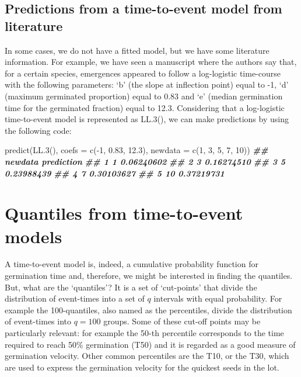 \documentclass[
]{book}
\newenvironment{Shaded}{\begin{snugshade}}{\end{snugshade}}
\newcommand{\AttributeTok}[1]{\textcolor[rgb]{0.77,0.63,0.00}{#1}}
\newcommand{\DecValTok}[1]{\textcolor[rgb]{0.00,0.00,0.81}{#1}}
\newcommand{\DocumentationTok}[1]{\textcolor[rgb]{0.56,0.35,0.01}{\textbf{\textit{#1}}}}
\newcommand{\FloatTok}[1]{\textcolor[rgb]{0.00,0.00,0.81}{#1}}
\newcommand{\FunctionTok}[1]{\textcolor[rgb]{0.00,0.00,0.00}{#1}}
\newcommand{\NormalTok}[1]{#1}
\newcommand{\SpecialCharTok}[1]{\textcolor[rgb]{0.00,0.00,0.00}{#1}}
\begin{document}
\hypertarget{predictions-from-a-time-to-event-model-from-literature}{%
\section{Predictions from a time-to-event model from literature}\label{predictions-from-a-time-to-event-model-from-literature}}

In some cases, we do not have a fitted model, but we have some literature information. For example, we have seen a manuscript where the authors say that, for a certain species, emergences appeared to follow a log-logistic time-course with the following parameters: `b' (the slope at inflection point) equal to -1, `d' (maximum germinated proportion) equal to 0.83 and `e' (median germination time for the germinated fraction) equal to 12.3. Considering that a log-logistic time-to-event model is represented as LL.3(), we can make predictions by using the following code:

\begin{Shaded}
\begin{Highlighting}[]
\FunctionTok{predict}\NormalTok{(}\FunctionTok{LL.3}\NormalTok{(), }\AttributeTok{coefs =} \FunctionTok{c}\NormalTok{(}\SpecialCharTok{{-}}\DecValTok{1}\NormalTok{, }\FloatTok{0.83}\NormalTok{, }\FloatTok{12.3}\NormalTok{),}
        \AttributeTok{newdata =} \FunctionTok{c}\NormalTok{(}\DecValTok{1}\NormalTok{, }\DecValTok{3}\NormalTok{, }\DecValTok{5}\NormalTok{, }\DecValTok{7}\NormalTok{, }\DecValTok{10}\NormalTok{))}
\DocumentationTok{\#\#   newdata prediction}
\DocumentationTok{\#\# 1       1 0.06240602}
\DocumentationTok{\#\# 2       3 0.16274510}
\DocumentationTok{\#\# 3       5 0.23988439}
\DocumentationTok{\#\# 4       7 0.30103627}
\DocumentationTok{\#\# 5      10 0.37219731}
\end{Highlighting}
\end{Shaded}

\hypertarget{quantiles-from-time-to-event-models}{%
\chapter{Quantiles from time-to-event models}\label{quantiles-from-time-to-event-models}}

A time-to-event model is, indeed, a cumulative probability function for germination time and, therefore, we might be interested in finding the quantiles. But, what are the `quantiles'? It is a set of `cut-points' that divide the distribution of event-times into a set of \(q\) intervals with equal probability. For example the 100-quantiles, also named as the percentiles, divide the distribution of event-times into \(q = 100\) groups. Some of these cut-off points may be particularly relevant: for example the 50-th percentile corresponds to the time required to reach 50\% germination (T50) and it is regarded as a good measure of germination velocity. Other common percentiles are the T10, or the T30, which are used to express the germination velocity for the quickest seeds in the lot.
\end{document}
